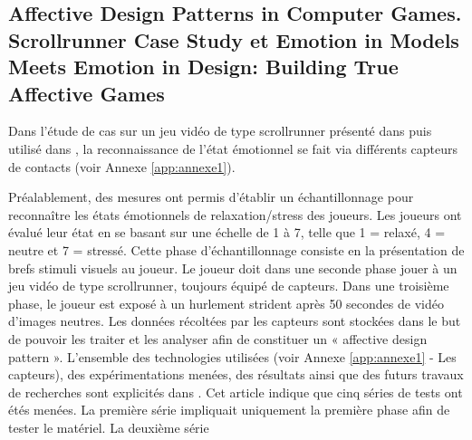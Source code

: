 \documentclass{article}
\begin{document}
    \subsection{Affective Design Patterns in Computer Games. Scrollrunner Case Study et Emotion in Models Meets Emotion in Design: Building True Affective Games}
        Dans l’étude de cas sur un jeu vidéo de type scrollrunner présenté dans \cite{nalepa_et_al._2017} puis utilisé dans \cite{gizycka_et_al._2018}, la reconnaissance de l’état émotionnel se fait via différents capteurs de contacts (voir Annexe \ref{app:annexe1}).\par
        Préalablement, des mesures ont permis d’établir un échantillonnage pour reconnaître les états émotionnels de relaxation/stress des joueurs. Les joueurs ont évalué leur état en se basant sur une échelle de 1 à 7, telle que 1 = relaxé, 4 = neutre et 7 = stressé. 
        Cette phase d’échantillonnage consiste en la présentation de brefs stimuli visuels au joueur. 
        Le joueur doit dans une seconde phase jouer à un jeu vidéo de type scrollrunner, toujours équipé de capteurs. 
        Dans une troisième phase, le joueur est exposé à un hurlement strident après 50 secondes de vidéo d’images neutres. 
        Les données récoltées par les capteurs sont stockées dans le but de pouvoir les traiter et les analyser afin de constituer un « affective design pattern ». 
        L’ensemble des technologies utilisées (voir Annexe \ref{app:annexe1} - Les capteurs), des expérimentations menées, des résultats ainsi que des futurs travaux de recherches sont explicités dans \cite{nalepa_et_al._2019}.
        Cet article indique que cinq séries de tests ont étés menées.
        La première série impliquait uniquement la première phase afin de tester le matériel.
        La deuxième série
\end{document}
